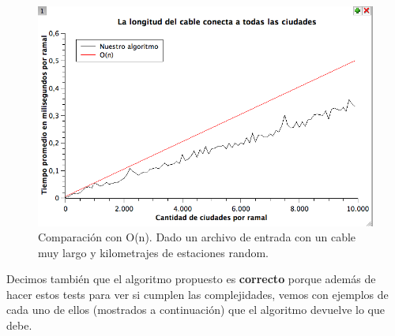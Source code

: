 \begin{figure}[H]
\begin{center}

  \includegraphics[width=\linewidth]{../graficos/ej1/CableLargo.png}
  \caption{{\small Comparación con O(n). Dado un archivo de entrada con un cable muy largo y kilometrajes de estaciones random.}} \label{ej1-tiempo-vs-cant-ciudades-random-long-cable-larga}
\endminipage

\end{center}
\end{figure}


Decimos también que el algoritmo propuesto es \textbf{correcto} porque además de hacer estos tests para ver si cumplen las complejidades, vemos con ejemplos de cada uno de ellos (mostrados a continuación) que el algoritmo devuelve lo que debe.\\

